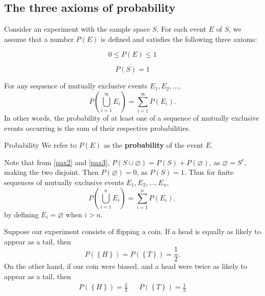 \subsection{The three axioms of probability}
Consider an experiment with the sample space $S$. For each event $E$ of $S$, we assume that a number $P(E)$ is defined and satisfies the following three axioms:
\begin{boxit}
    \begin{axiom}\label{pax1}
        \[
            0 \leq P(E) \leq 1
        \]
    \end{axiom}
    \begin{axiom}\label{pax2}
        \[
            P(S) = 1  
        \]
    \end{axiom}
    \begin{axiom}\label{pax3}
        For any sequence of mutually exclusive events $E_1, E_2, \dots$, \[
            P\left( \bigcup^\infty_{i=1} E_i \right) = \sum^{\infty}_{i=1}P(E_i). 
        \] In other words, the probability of at least one of a sequence of mutually exclusive events occurring is the sum of their respective probabilities.
    \end{axiom}
\end{boxit}

\begin{bdef}{Probability}\label{pdef}
    We refer to $P(E)$ as the \textbf{probability} of the event $E$.
\end{bdef}

Note that from \autoref{pax2} and \autoref{pax3}, $P(S \cup \varnothing) = P(S) + P(\varnothing)$, as $\varnothing = S^c$, making the two disjoint. Then $P(\varnothing) = 0$, as $P(S) = 1$. Thus for finite sequences of mutually exclusive events $E_1, E_2, \dots, E_n$, \[
    P\left( \bigcup^n_{i=1} E_i \right) = \sum^n_{i=1} P(E_i),    
\] by defining $E_i = \varnothing$ when $i > n$.

\begin{changebar}
\begin{example}\label{coinprobex}
    Suppose our experiment consists of flipping a coin. If a head is equally as likely to appear as a tail, then \[
        P(\left\{ H \right\}) = P(\left\{ T \right\}) = \frac{1}{2}.    
    \] On the other hand, if our coin were biased, and a head were twice as likely to appear as a tail, then
    \begin{align*}
        P(\left\{ H \right\}) = \frac{2}{3} && P(\left\{ T \right\}) = \frac{1}{3}
    \end{align*}    
\end{example}
\end{changebar}

